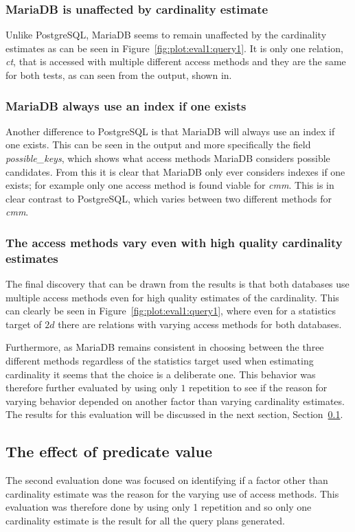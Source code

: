 \subsubsection{MariaDB is unaffected by cardinality estimate}
Unlike PostgreSQL, MariaDB seems to remain unaffected by the cardinality
estimates as can be seen in Figure~\ref{fig:plot:eval1:query1}. It is only one
relation, \textit{ct}, that is accessed with multiple different access methods
and they are the same for both tests, as can seen from the output, shown in.

\subsubsection{MariaDB always use an index if one exists}
Another difference to PostgreSQL is that MariaDB will always use an index if one
exists. This can be seen in the output and more specifically the field
\textit{possible\_keys}, which shows what access methods MariaDB considers
possible candidates. From this it is clear that MariaDB only ever considers
indexes if one exists; for example only one access method is found viable for
\textit{cmm}. This is in clear contrast to PostgreSQL, which varies between two
different methods for \textit{cmm}.

\subsubsection{The access methods vary even with high quality cardinality estimates}
The final discovery that can be drawn from the results is that both databases
use multiple access methods even for high quality estimates of the cardinality.
This can clearly be seen in Figure~\ref{fig:plot:eval1:query1}, where even for a
statistics target of $2d$ there are relations with varying access methods for both
databases.

Furthermore, as MariaDB remains consistent in choosing between the three
different methods regardless of the statistics target used when estimating
cardinality it seems that the choice is a deliberate one. This behavior was
therefore further evaluated by using only $1$ repetition to see if the reason for
varying behavior depended on another factor than varying cardinality estimates.
The results for this evaluation will be discussed in the next section,
Section~\ref{sec:predicatecorrelation}.

\subsection{The effect of predicate value}\label{sec:predicatecorrelation}
The second evaluation done was focused on identifying if a factor other than
cardinality estimate was the reason for the varying use of access methods. This
evaluation was therefore done by using only 1 repetition and so only one
cardinality estimate is the result for all the query plans generated.

